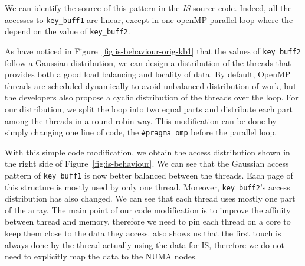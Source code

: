 %

We can identify the source of this pattern in the \emph{IS} source code. Indeed, all the accesses to \texttt{key\_buff1} are linear,
except in one openMP parallel loop where the depend on the value of
\texttt{key\_buff2}.

As have noticed in Figure~\ref{fig:is-behaviour-orig-kb1} that the values of \texttt{key\_buff2}
follow a Gaussian distribution, we can design a distribution of the threads that
provides both a good load balancing and locality of data.
By default, OpenMP threads are scheduled dynamically to avoid unbalanced
distribution of work, but the developers also propose a cyclic distribution
of the threads over the loop.
For our distribution, we split
the loop into two equal parts and distribute each part among the threads in a round-robin way.
This modification can be done by simply changing one line of code, the
\texttt{\#pragma omp} before the parallel loop.



With this simple code modification, we obtain the access distribution
shown in the right side of Figure~\ref{fig:is-behaviour}. We can see that the Gaussian
access pattern of \texttt{key\_buff1} is now better balanced between the threads. Each page
of this structure is mostly used by only one thread. Moreover,
\texttt{key\_buff2}'s access distribution has also changed. We can see that
each thread uses mostly one part of the array.
The main point of our code modification is to improve the affinity between
thread and memory, therefore we need to pin each thread on a core to keep them
close to the data they access. %
\TABARNAC also shows us that the first touch is always done by the thread actually using
the data for IS, therefore we do not need to explicitly map the data to the NUMA nodes.

